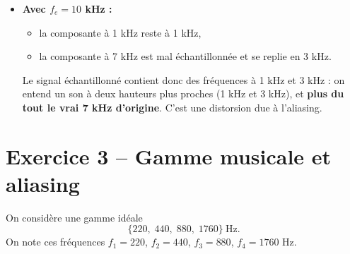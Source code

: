 \begin{enumerate}[label=(\alph*)]
\begin{itemize}
    \item \textbf{Avec $f_e = 10$ kHz :}
    \begin{itemize}
        \item la composante à 1 kHz reste à 1 kHz,
        \item la composante à 7 kHz est mal échantillonnée et se replie en 3 kHz.
    \end{itemize}
    Le signal échantillonné contient donc des fréquences à 1 kHz et 3 kHz : on entend un son à deux hauteurs plus proches (1 kHz et 3 kHz), et \textbf{plus du tout le vrai 7 kHz d’origine}. C’est une distorsion due à l’aliasing.
\end{itemize}

\end{enumerate}

\section*{Exercice 3 – Gamme musicale et aliasing}

On considère une gamme idéale
\[
\{220,\; 440,\; 880,\; 1760\}\ \text{Hz}.
\]
On note ces fréquences $f_1 = 220$, $f_2 = 440$, $f_3 = 880$, $f_4 = 1760$ Hz.

